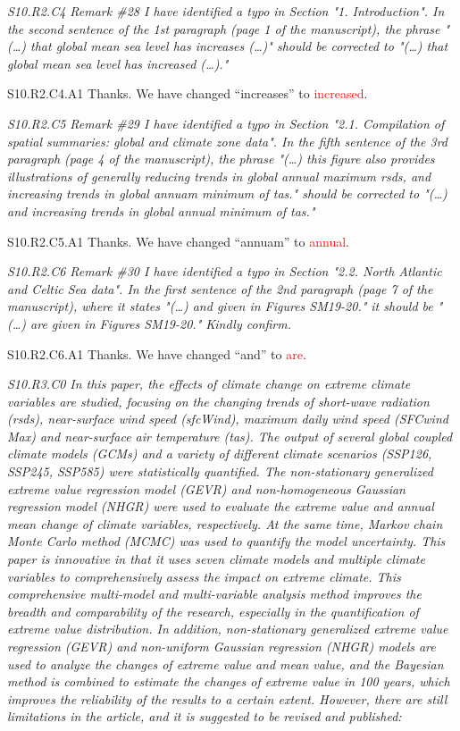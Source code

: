 \documentclass[a4paper,10pt]{article}
\newcommand{\ed}[1]{\textcolor{red}{#1}}
\begin{document}
	\emph{S10.R2.C4 Remark \#28 I have identified a typo in Section "1. Introduction". In the second sentence of the 1st paragraph (page 1 of the manuscript), the phrase "(…) that global mean sea level has increases (…)" should be corrected to "(…) that global mean sea level has increased (…)."}

	S10.R2.C4.A1 Thanks. We have changed ``increases'' to \ed{increased}.

	\emph{S10.R2.C5 Remark \#29 I have identified a typo in Section "2.1. Compilation of spatial summaries: global and climate zone data". In the fifth sentence of the 3rd paragraph (page 4 of the manuscript), the phrase "(…) this figure also provides illustrations of generally reducing trends in global annual maximum rsds, and increasing trends in global annuam minimum of tas." should be corrected to "(…) and increasing trends in global annual minimum of tas."}

	S10.R2.C5.A1 Thanks. We have changed ``annuam'' to \ed{annual}.

	\emph{S10.R2.C6 Remark \#30 I have identified a typo in Section "2.2. North Atlantic and Celtic Sea data". In the first sentence of the 2nd paragraph (page 7 of the manuscript), where it states "(…) and given in Figures SM19-20." it should be "(…) are given in Figures SM19-20." Kindly confirm.}

	S10.R2.C6.A1 Thanks. We have changed ``and'' to \ed{are}.

	\emph{S10.R3.C0 In this paper, the effects of climate change on extreme climate variables are studied, focusing on the changing trends of short-wave radiation (rsds), near-surface wind speed (sfcWind), maximum daily wind speed (SFCwind Max) and near-surface air temperature (tas). The output of several global coupled climate models (GCMs) and a variety of different climate scenarios (SSP126, SSP245, SSP585) were statistically quantified. The non-stationary generalized extreme value regression model (GEVR) and non-homogeneous Gaussian regression model (NHGR) were used to evaluate the extreme value and annual mean change of climate variables, respectively. At the same time, Markov chain Monte Carlo method (MCMC) was used to quantify the model uncertainty. This paper is innovative in that it uses seven climate models and multiple climate variables to comprehensively assess the impact on extreme climate. This comprehensive multi-model and multi-variable analysis method improves the breadth and comparability of the research, especially in the quantification of extreme value distribution. In addition, non-stationary generalized extreme value regression (GEVR) and non-uniform Gaussian regression (NHGR) models are used to analyze the changes of extreme value and mean value, and the Bayesian method is combined to estimate the changes of extreme value in 100 years, which improves the reliability of the results to a certain extent. However, there are still limitations in the article, and it is suggested to be revised and published:}
\end{document}

